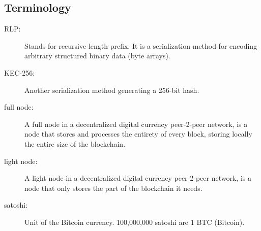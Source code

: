 \documentclass[USenglish]{uit-thesis}
\begin{document}



\begin{appendices}
	\chapter{Terminology}
	\label{app:terminology}
	\begin{description}
		\item[RLP:] Stands for recursive length prefix. It is a serialization method
		for encoding arbitrary structured binary data (byte arrays).
		\label{item:rlp}
		\item[KEC-256:] Another serialization method generating a 256-bit hash.
		\item[full node:] A full node in a decentralized digital currency peer-2-peer network, is a node that stores
		and processes the entirety of every block, storing locally the entire size of the blockchain.
		\item[light node:] A light node in a decentralized digital currency peer-2-peer network, is a node that only
		stores the part of the blockchain it needs.
		\item[satoshi:] Unit of the Bitcoin currency. 100,000,000 satoshi are 1 BTC (Bitcoin).
	\end{description}


\end{appendices}
\end{document}

